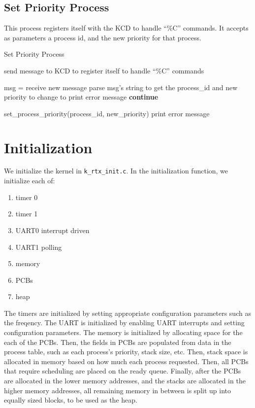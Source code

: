 \documentclass[12pt]{report}
\begin{document}
\subsection{Set Priority Process}

This process registers itself with the KCD to handle ``\%C'' commands. It accepts as parameters a process id, and the new priority for that process.

\begin{algorithm}[H]
	\caption{Set Priority Process}
	\begin{algorithmic}[1]
	  	\State send message to KCD to register itself to handle ``\%C'' commands

	  		\State msg = receive new message
	  		\State parse msg's string to get the process_id and new priority to change to
	  			\State print error message
	  			\State \textbf{continue}
	  		\EndIf

	  		\State set_process_priority(process_id, new_priority)
	  			\State print error message
	  		\EndIf
	  	\EndWhile
	  \EndFunction
	\end{algorithmic}
\end{algorithm}



\section{Initialization}

We initialize the kernel in \texttt{k\_rtx\_init.c}. In the initialization function, we initialize each of:
\begin{enumerate}
	\item timer 0
	\item timer 1
	\item UART0 interrupt driven
	\item UART1 polling
	\item memory
	\item PCBs
	\item heap 
\end{enumerate}

The timers are initialized by setting appropriate configuration parameters such as the freqency. The UART is initialized by enabling UART interrupts and setting configuration parameters. The memory is initialized by allocating space for the each of the PCBs. Then, the fields in PCBs are populated from data in the process table, such as each process's priority, stack size, etc. Then, stack space is allocated in memory based on how much each process requested. Then, all PCBs that require scheduling are placed on the ready queue. Finally, after the PCBs are allocated in the lower memory addresses, and the stacks are allocated in the higher memory addresses, all remaining memory in between is split up into equally sized blocks, to be used as the heap. 
\end{document}
